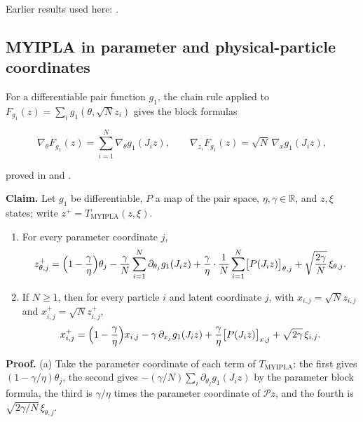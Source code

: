 \documentclass[11pt,a4paper]{report}
\begin{document}
Earlier results used here: \cite[Section~3.1.1]{LangevinLean2026IPLA}.
\subsection{\texorpdfstring{MYIPLA in parameter and physical-particle coordinates}{MYIPLA in parameter and physical-particle coordinates}}
\label{report-step-ProximalLangevin-Algorithms-lean-5}


For a differentiable pair function \(g_1\), the chain rule applied to \(F_{g_1}(z)=\sum_ig_1(\theta,\sqrt Nz_i)\) gives the block formulas


\[\nabla_\theta F_{g_1}(z)=\sum_{i=1}^N\nabla_\theta g_1(J_iz),\qquad\nabla_{z_i}F_{g_1}(z)=\sqrt N\,\nabla_xg_1(J_iz),\]


proved in \cite[Section~3.1.5]{LangevinLean2026IPLA} and \cite[Section~3.1.5]{LangevinLean2026IPLA}.




\textbf{Claim.} Let \(g_1\) be differentiable, \(P\) a map of the pair space, \(\eta,\gamma\in\mathbb R\), and \(z,\xi\) states; write \(z^+=T_{\mathrm{MYIPLA}}(z,\xi)\).



\begin{enumerate}


\item For every parameter coordinate \(j\),
\[z^+_{\theta,j}=\Bigl(1-\frac\gamma\eta\Bigr)\theta_j-\frac\gamma N\sum_{i=1}^N\partial_{\theta_j}g_1(J_iz)+\frac\gamma\eta\cdot\frac1N\sum_{i=1}^N\bigl[P(J_iz)\bigr]_{\theta,j}+\sqrt{\frac{2\gamma}N}\,\xi_{\theta,j}.\]

\item If \(N\ge1\), then for every particle \(i\) and latent coordinate \(j\), with \(x_{i,j}=\sqrt Nz_{i,j}\) and \(x^+_{i,j}=\sqrt Nz^+_{i,j}\),
\[x^+_{i,j}=\Bigl(1-\frac\gamma\eta\Bigr)x_{i,j}-\gamma\,\partial_{x_j}g_1(J_iz)+\frac\gamma\eta\bigl[P(J_iz)\bigr]_{x,j}+\sqrt{2\gamma}\,\xi_{i,j}.\]

\end{enumerate}



\textbf{Proof.} (a) Take the parameter coordinate of each term of \(T_{\mathrm{MYIPLA}}\): the first gives \((1-\gamma/\eta)\theta_j\), the second gives \(-(\gamma/N)\sum_i\partial_{\theta_j}g_1(J_iz)\) by the parameter block formula, the third is \(\gamma/\eta\) times the parameter coordinate of \(\mathcal Pz\), and the fourth is \(\sqrt{2\gamma/N}\,\xi_{\theta,j}\).
\end{document}
